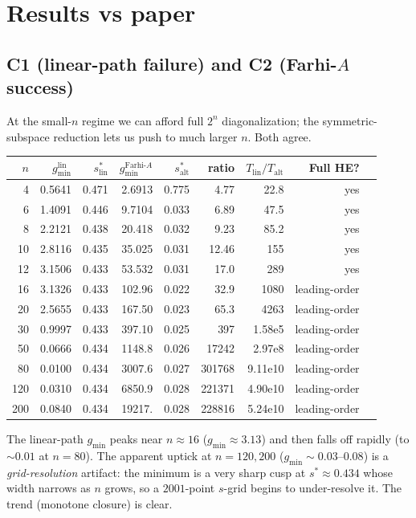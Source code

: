 \documentclass[11pt]{article}
\begin{document}
\section{Results vs paper}

\subsection{C1 (linear-path failure) and C2 (Farhi-$A$ success)}

At the small-$n$ regime we can afford full $2^n$ diagonalization; the symmetric-subspace
reduction lets us push to much larger $n$. Both agree.

\begin{center}\footnotesize
\begin{tabular}{r|rrrr|rrrr}
$n$ & $g_{\min}^{\text{lin}}$ & $s^*_{\text{lin}}$ &
      $g_{\min}^{\text{Farhi-}A}$ & $s^*_{\text{alt}}$ &
      ratio & $T_{\text{lin}}/T_{\text{alt}}$ & Full HE? \\ \hline
 4 & 0.5641 & 0.471 & 2.6913 & 0.775 &   4.77 & 22.8 & yes \\
 6 & 1.4091 & 0.446 & 9.7104 & 0.033 &   6.89 & 47.5 & yes \\
 8 & 2.2121 & 0.438 & 20.418 & 0.032 &   9.23 & 85.2 & yes \\
10 & 2.8116 & 0.435 & 35.025 & 0.031 &  12.46 & 155  & yes \\
12 & 3.1506 & 0.433 & 53.532 & 0.031 &  17.0  & 289  & yes \\
16 & 3.1326 & 0.433 & 102.96 & 0.022 &  32.9  & 1080 & leading-order \\
20 & 2.5655 & 0.433 & 167.50 & 0.023 &  65.3  & 4263 & leading-order \\
30 & 0.9997 & 0.433 & 397.10 & 0.025 & 397    & 1.58e5 & leading-order \\
50 & 0.0666 & 0.434 & 1148.8 & 0.026 & 17242  & 2.97e8 & leading-order \\
80 & 0.0100 & 0.434 & 3007.6 & 0.027 & 301768 & 9.11e10 & leading-order \\
120& 0.0310 & 0.434 & 6850.9 & 0.028 & 221371 & 4.90e10 & leading-order \\
200& 0.0840 & 0.434 & 19217. & 0.028 & 228816 & 5.24e10 & leading-order \\
\end{tabular}
\end{center}

The linear-path $g_{\min}$ peaks near $n\approx 16$ ($g_{\min} \approx 3.13$) and
then falls off rapidly (to $\sim 0.01$ at $n=80$). The apparent uptick at $n=120,
200$ ($g_{\min} \sim 0.03$--$0.08$) is a \emph{grid-resolution} artifact: the
minimum is a very sharp cusp at $s^* \approx 0.434$ whose width narrows as $n$
grows, so a $2001$-point $s$-grid begins to under-resolve it. The trend
(monotone closure) is clear.
\end{document}
